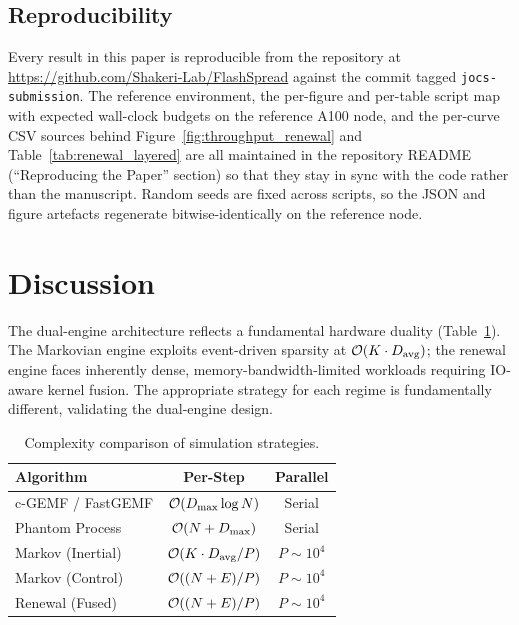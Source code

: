 \subsection{Reproducibility}
\label{sec:repro}

Every result in this paper is reproducible from the repository at \url{https://github.com/Shakeri-Lab/FlashSpread} against the commit tagged \texttt{jocs-submission}. The reference environment, the per-figure and per-table script map with expected wall-clock budgets on the reference A100 node, and the per-curve CSV sources behind Figure~\ref{fig:throughput_renewal} and Table~\ref{tab:renewal_layered} are all maintained in the repository README (``Reproducing the Paper'' section) so that they stay in sync with the code rather than the manuscript. Random seeds are fixed across scripts, so the JSON and figure artefacts regenerate bitwise-identically on the reference node.

\section{Discussion}\label{sec:discussion}

The dual-engine architecture reflects a fundamental hardware duality (Table~\ref{tab:complexity}). The Markovian engine exploits event-driven sparsity at $\mathcal{O}(K \cdot D_{\mathrm{avg}})$; the renewal engine faces inherently dense, memory-bandwidth-limited workloads requiring IO-aware kernel fusion. The appropriate strategy for each regime is fundamentally different, validating the dual-engine design.

\begin{table}[H]
\centering
\caption{Complexity comparison of simulation strategies.}
\label{tab:complexity}
\begin{tabular*}{\linewidth}{@{}lcc@{}}
\toprule
\textbf{Algorithm} & \textbf{Per-Step} & \textbf{Parallel} \\
\midrule
c-GEMF / FastGEMF & $\mathcal{O}(D_{\max} \log N)$ & Serial \\
Phantom Process & $\mathcal{O}(N + D_{\max})$ & Serial \\
\midrule
Markov (Inertial) & $\mathcal{O}(K \cdot D_{\text{avg}} / P)$ & $P \sim 10^4$ \\
Markov (Control) & $\mathcal{O}((N + E) / P)$ & $P \sim 10^4$ \\
Renewal (Fused) & $\mathcal{O}((N + E) / P)$ & $P \sim 10^4$ \\
\bottomrule
\end{tabular*}
\end{table}

